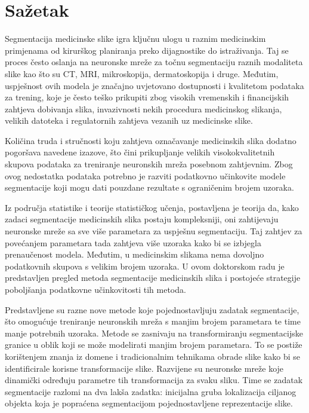 \chapter{Sažetak}

Segmentacija medicinske slike igra ključnu ulogu u raznim medicinskim primjenama od kirurškog planiranja preko dijagnostike do istraživanja. Taj se proces često oslanja na neuronske mreže za točnu segmentaciju raznih modaliteta slike kao što su CT, MRI, mikroskopija, dermatoskopija i druge. Međutim, uspješnost ovih modela je značajno uvjetovano dostupnosti i kvalitetom podataka za trening, koje je često teško prikupiti zbog visokih vremenskih i financijskih zahtjeva dobivanja slika, invazivnosti nekih procedura medicinskog slikanja, velikih datoteka i regulatornih zahtjeva vezanih uz medicinske slike.

Količina truda i stručnosti koju zahtjeva označavanje medicinskih slika  dodatno pogoršava navedene izazove, što čini prikupljanje velikih visokokvalitetnih skupova podataka za treniranje neuronskih mreža posebnom zahtjevnim. Zbog ovog nedostatka podataka potrebno je razviti podatkovno učinkovite modele segmentacije koji mogu dati pouzdane rezultate s ograničenim brojem uzoraka.

Iz područja statistike i teorije statističkog učenja, postavljena je teorija da, kako zadaci segmentacije medicinskih slika postaju kompleksniji, oni zahtijevaju neuronske mreže sa sve više parametara za uspješnu segmentaciju. Taj zahtjev za povećanjem parametara tada zahtjeva više uzoraka kako bi se izbjegla prenaučenost modela. Međutim, u medicinskim slikama nema dovoljno podatkovnih skupova s velikim brojem uzoraka. U ovom doktorskom radu je predstavljen pregled metoda segmentacije medicinskih slika i postojeće strategije poboljšanja podatkovne učinkovitosti tih metoda.

Predstavljene su razne nove metode koje pojednostavljuju zadatak segmentacije, što omogućuje treniranje neuronskih mreža s manjim brojem parametara te time manje potrebnih uzoraka. Metode se zasnivaju na transformiranju segmentacijske granice u oblik koji se može modelirati manjim brojem parametara. To se postiže korištenjem znanja iz domene i tradicionalnim tehnikama obrade slike kako bi se identificirale korisne transformacije slike. Razvijene su neuronske mreže koje dinamički određuju parametre tih transformacija za svaku sliku. Time se zadatak segmentacije razlomi na dva lakša zadatka: inicijalna gruba lokalizacija ciljanog objekta koja je popraćena segmentacijom pojednostavljene reprezentacije slike.

